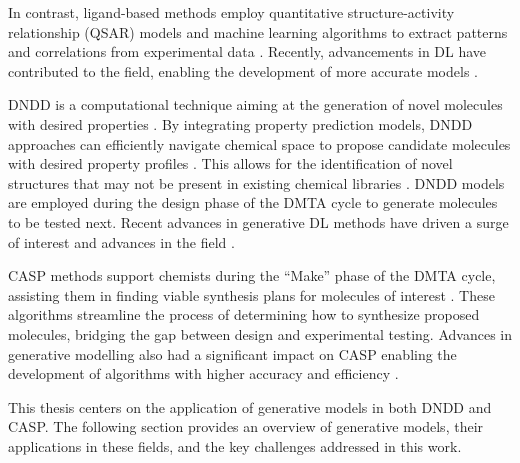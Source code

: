 In contrast, ligand-based methods employ quantitative structure-activity relationship (QSAR) models and machine learning
algorithms to extract patterns and correlations from experimental data \citep{cherkasovQSARModelingWhere2014}.
Recently, advancements in \ac{DL} have contributed to the field, enabling the development of more accurate models
\citep{lusciDeepArchitecturesDeep2013,unterthinerDeepLearningOpportunity2015,chenRiseDeepLearning2018,hochreiterMachineLearningDrug2018,mayrLargescaleComparisonMachine2018,stanleyFSMolFewShotLearning2021,seidlEnhancingActivityPrediction2023}.

\Ac{DNDD} is a computational technique aiming at the generation of novel molecules with desired properties
\citep{schneiderNovoMolecularDesign2013}. By integrating property prediction models, \ac{DNDD} approaches can
efficiently navigate chemical space to propose candidate molecules with desired property profiles
\citep{gaoSampleEfficiencyMatters2022}. This allows for the identification of novel structures that may not be present
in existing chemical libraries \citep{brownGuacaMolBenchmarkingModels2019}. \ac{DNDD} models are employed during the
design phase of the \ac{DMTA} cycle to generate molecules to be tested next. Recent advances in generative \ac{DL}
methods
\citep{bond-taylorDeepGenerativeModelling2022,brownLanguageModelsAre2020,goodfellowGenerativeAdversarialNets2014,
dinhDensityEstimationUsing2017,kingmaAutoEncodingVariationalBayes2013,hoDenoisingDiffusionProbabilistic2020,vaswaniAttentionAllYou2017}
have driven a surge of interest and advances in the field
\citep{eltonDeepLearningMolecular2019,sanchez-lengelingInverseMolecularDesign2018,ekinsIntroductionGenerativeDrug2025}.

\Ac{CASP} methods support chemists during the “Make” phase of the \ac{DMTA} cycle, assisting them in finding viable
synthesis plans for molecules of interest
\citep{coreyComputerAssistedDesignComplex1969,coreyLogicChemicalSynthesis1989,seglerPlanningChemicalSyntheses2018}.
These algorithms streamline the process of determining how to synthesize proposed molecules, bridging the gap between
design and experimental testing. Advances in generative modelling also had a significant impact 
on \ac{CASP} enabling the development of algorithms with higher accuracy and efficiency
\citep{coleyMachineLearningComputerAided2018,maziarzReevaluatingRetrosynthesisAlgorithms2024}.

This thesis centers on the application of generative models in both \ac{DNDD} and \ac{CASP}. The following section
provides an overview of generative models, their applications in these fields, and the key challenges addressed in this
work.

